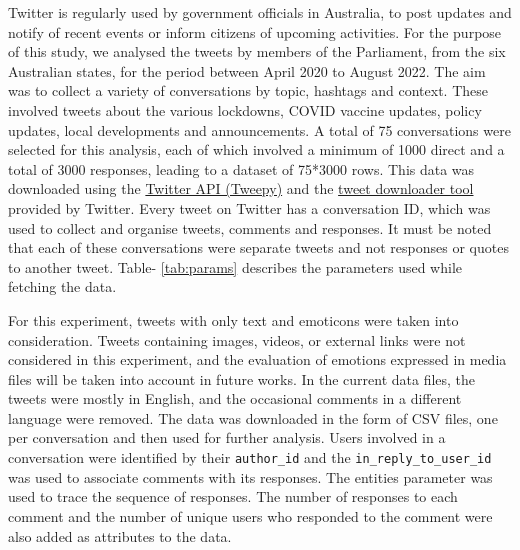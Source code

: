 \documentclass[acmtog]{acmart}
\begin{document}
Twitter is regularly used by government officials in Australia, to post updates and notify of recent events or inform citizens of upcoming activities. For the purpose of this study, we analysed the tweets by members of the Parliament, from the six Australian states, for the period between April 2020 to August 2022. The aim was to collect a variety of conversations by topic, hashtags and context. These involved tweets about the various lockdowns, COVID vaccine updates, policy updates, local developments and announcements. A total of 75 conversations were selected for this analysis, each of which involved a minimum of 1000 direct and a total of 3000 responses, leading to a dataset of 75*3000 rows. This data was downloaded using the \href{https://developer.twitter.com/en/docs/twitter-api}{Twitter API (Tweepy)} and the \href{https://developer.twitter.com/apitools/downloader}{tweet downloader tool} provided by Twitter. Every tweet on Twitter has a conversation ID, which was used to collect and organise tweets, comments and responses. It must be noted that each of these conversations were separate tweets and not responses or quotes to another tweet. Table- \ref{tab:params} describes the parameters used while fetching the data.


For this experiment, tweets with only text and emoticons were taken into consideration. Tweets containing images, videos, or external links were not considered in this experiment, and the evaluation of emotions expressed in media files will be taken into account in future works. In the current data files, the tweets were mostly in English, and the occasional comments in a different language were removed. The data was downloaded in the form of CSV files, one per conversation and then used for further analysis. Users involved in a conversation were identified by their \texttt{author\_id} and the \texttt{in\_reply\_to\_user\_id} was used to associate comments with its responses. The entities parameter was used to trace the sequence of responses. The number of responses to each comment and the number of unique users who responded to the comment were also added as attributes to the data. 
\end{document}
